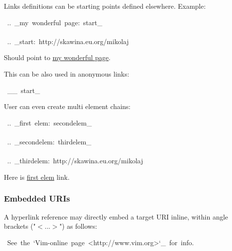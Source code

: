 \documentclass[12pt]{article}
\begin{document}
Links definitions can be starting points defined elsewhere. Example:

\begin{ttfamily}\begin{flushleft}
\mbox{~..~\_my~wonderful~page:~start\_}\\
\mbox{}\\
\mbox{~..~\_start:~http://skawina.eu.org/mikolaj}\\
\end{flushleft}\end{ttfamily}

Should point to \href{http://skawina.eu.org/mikolaj}{my wonderful page}.

This can be also used in anonymous links:

\begin{ttfamily}\begin{flushleft}
\mbox{~\_\_~start\_}\\
\end{flushleft}\end{ttfamily}

User can even create multi element chains:

\begin{ttfamily}\begin{flushleft}
\mbox{~..~\_first~elem:~secondelem\_}\\
\mbox{}\\
\mbox{~..~\_secondelem:~thirdelem\_}\\
\mbox{}\\
\mbox{~..~\_thirdelem:~http://skawina.eu.org/mikolaj}\\
\end{flushleft}\end{ttfamily}

Here is \href{http://skawina.eu.org/mikolaj}{first elem} link.

\hypertarget{lembedded-uris}{}
\subsubsection{Embedded URIs}

A hyperlink reference may directly embed a target URI inline, within
angle brackets ("$<$...$>$") as follows:

\begin{ttfamily}\begin{flushleft}
\mbox{~See~the~`Vim-online~page~<http://www.vim.org>`\_~for~info.}\\
\end{flushleft}\end{ttfamily}
\end{document}
